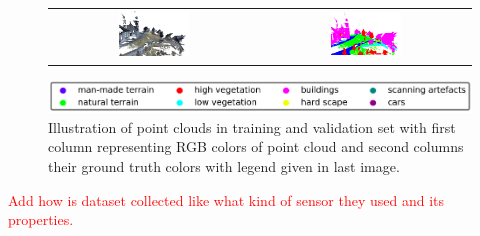 \begin{figure}
\begin{tabular}{cc}
        \includegraphics[width=0.35\textwidth, height=0.15\textheight]{images/sem3d_data/5.pdf} & 
        \includegraphics[width=0.35\textwidth, height=0.15\textheight]{images/sem3d_data/5_gt.pdf}\\
    \end{tabular}
    \includegraphics[scale=0.65]{images/legend.png}
    \caption{Illustration of point clouds in training and validation set with first column representing RGB colors of point cloud and second columns their ground truth colors with legend given in last image.}
    \label{fig:sem3d_gt_vis}
\end{figure}

\textcolor{red}{Add how is dataset collected like what kind of sensor they used and its properties.}
